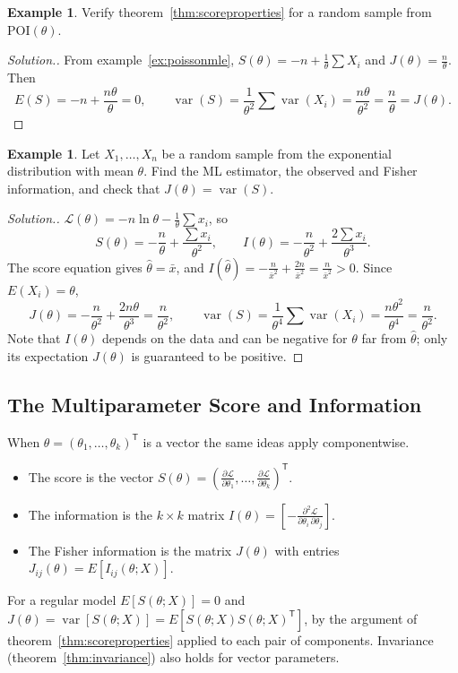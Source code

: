 \documentclass[12pt,a4paper]{report}
\theoremstyle{definition}
\newtheorem{exa}[thm]{Example}
\DeclareMathOperator{\var}{var}
\newenvironment{solution}
  {\renewcommand{\qedsymbol}{}\begin{proof}[\textit{Solution}.]}
  {\end{proof}}
\begin{document}
\begin{exa}
\label{ex:poissonscore}
Verify theorem~\ref{thm:scoreproperties} for a random sample from $\text{POI}(\theta)$.
\end{exa}

\begin{solution}
From example~\ref{ex:poissonmle}, $S(\theta) = -n + \frac1\theta\sum X_i$ and
$J(\theta) = \frac n\theta$. Then
\[E(S) = -n + \frac{n\theta}{\theta} = 0,\qquad
\var(S) = \frac{1}{\theta^2}\sum\var(X_i) = \frac{n\theta}{\theta^2} = \frac n\theta = J(\theta).\]
\end{solution}

\begin{exa}
\label{ex:exponentialinfo}
Let $X_1, \dots, X_n$ be a random sample from the exponential distribution with
mean $\theta$. Find the ML estimator, the observed and Fisher information, and
check that $J(\theta) = \var(S)$.
\end{exa}

\begin{solution}
$\mathcal{L}(\theta) = -n\ln\theta - \frac1\theta\sum x_i$, so
\[S(\theta) = -\frac n\theta + \frac{\sum x_i}{\theta^2},\qquad
I(\theta) = -\frac{n}{\theta^2} + \frac{2\sum x_i}{\theta^3} .\]
The score equation gives $\hat\theta = \bar x$, and $I(\hat\theta) = -\frac{n}{\bar x^2} +
\frac{2n}{\bar x^2} = \frac{n}{\bar x^2}>0$. Since $E(X_i) = \theta$,
\[J(\theta) = -\frac{n}{\theta^2} + \frac{2n\theta}{\theta^3} = \frac{n}{\theta^2},\qquad
\var(S) = \frac{1}{\theta^4}\sum\var(X_i) = \frac{n\theta^2}{\theta^4} = \frac{n}{\theta^2} .\]
Note that $I(\theta)$ depends on the data and can be negative for $\theta$ far from
$\hat\theta$; only its expectation $J(\theta)$ is guaranteed to be positive.
\end{solution}

\subsection{The Multiparameter Score and Information}

When $\theta = (\theta_1, \dots, \theta_k)^{\mathsf T}$ is a vector the same ideas
apply componentwise.
\begin{itemize}
\item The score is the vector
$S(\theta) = \left(\frac{\partial\mathcal{L}}{\partial\theta_1}, \dots, \frac{\partial\mathcal{L}}{\partial\theta_k}\right)^{\mathsf T}$.
\item The information is the $k\times k$ matrix
$I(\theta) = \left[-\frac{\partial^2\mathcal{L}}{\partial\theta_i\,\partial\theta_j}\right]$.
\item The Fisher information is the matrix $J(\theta)$ with entries
$J_{ij}(\theta) = E\left[I_{ij}(\theta; X)\right]$.
\end{itemize}
For a regular model $E\left[S(\theta; X)\right] = 0$ and
$J(\theta) = \var\left[S(\theta; X)\right] = E\left[S(\theta; X)S(\theta; X)^{\mathsf T}\right]$,
by the argument of theorem~\ref{thm:scoreproperties} applied to each pair of
components. Invariance (theorem~\ref{thm:invariance}) also holds for vector
parameters.
\end{document}
